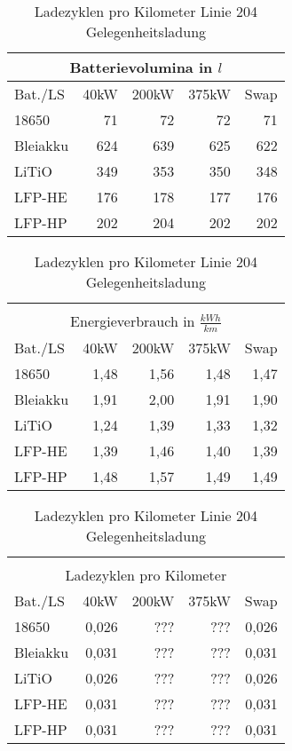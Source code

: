 \begin{table}
\begin{minipage}{0.45\textwidth}
	\end{minipage}\hfill
	\begin{minipage}{0.45\textwidth}
		\centering
		\begin{tabular}{lrrrr}
			\multicolumn{5}{c}{Batterievolumina in $l$} \\ \toprule
			Bat./LS  & 40kW & 200kW & 375kW &      Swap \\ \midrule
			18650    &   71 &    72 &    72 &        71 \\
			Bleiakku &  624 &   639 &   625 &       622 \\
			LiTiO    &  349 &   353 &   350 &       348 \\
			LFP-HE   &  176 &   178 &   177 &       176 \\
			LFP-HP   &  202 &   204 &   202 &       202 \\ \bottomrule
		\end{tabular}
		\caption{Batterievolumina Linie 204 Gelegenheitsladung}
		
		\begin{tabular}{lrrrr}
			         &      &       &       &  \\
			\multicolumn{5}{c}{Energieverbrauch in $\frac{kWh}{km}$} \\ \toprule
			Bat./LS  & 40kW & 200kW & 375kW &                   Swap \\ \midrule
			18650    & 1,48 &  1,56 &  1,48 &                   1,47 \\
			Bleiakku & 1,91 &  2,00 &  1,91 &                   1,90 \\
			LiTiO    & 1,24 &  1,39 &  1,33 &                   1,32 \\
			LFP-HE   & 1,39 &  1,46 &  1,40 &                   1,39 \\
			LFP-HP   & 1,48 &  1,57 &  1,49 &                   1,49 \\ \bottomrule
		\end{tabular} 
		\caption{Energieverbrauch Linie 204 Gelegenheitsladung}
		
		\begin{tabular}{lrrrr}
			         &       &       &       &  \\
			\multicolumn{5}{c}{Ladezyklen pro Kilometer} \\ \toprule
			Bat./LS  &  40kW & 200kW & 375kW &      Swap \\ \midrule
			18650    & 0,026 &   ??? &   ??? &     0,026 \\
			Bleiakku & 0,031 &   ??? &   ??? &     0,031 \\
			LiTiO    & 0,026 &   ??? &   ??? &     0,026 \\
			LFP-HE   & 0,031 &   ??? &   ??? &     0,031 \\
			LFP-HP   & 0,031 &   ??? &   ??? &     0,031 \\ \bottomrule
		\end{tabular} 
		\caption{Ladezyklen pro Kilometer Linie 204 Gelegenheitsladung}	
		\label{204_e}
	\end{minipage}
\end{table}
